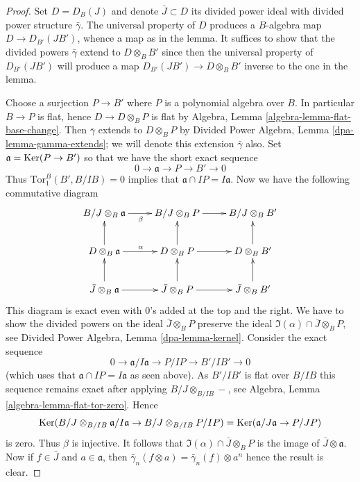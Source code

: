 \begin{proof}
Set $D = D_B(J)$ and denote $\bar J \subset D$ its divided power ideal
with divided power structure $\bar\gamma$. The universal property of
$D$ produces a $B$-algebra map $D \to D_{B'}(JB')$, whence a map as in
the lemma. It suffices to show that
the divided powers $\bar\gamma$ extend to $D \otimes_B B'$ since then
the universal property of $D_{B'}(JB')$ will produce a map
$D_{B'}(JB') \to D \otimes_B B'$ inverse to the one in the lemma.

\medskip\noindent
Choose a surjection $P \to B'$ where $P$ is a polynomial algebra over $B$.
In particular $B \to P$ is flat, hence $D \to D \otimes_B P$ is flat by
Algebra, Lemma \ref{algebra-lemma-flat-base-change}.
Then $\bar\gamma$ extends to $D \otimes_B P$ by
Divided Power Algebra, Lemma \ref{dpa-lemma-gamma-extends}; we
will denote this extension
$\bar\gamma$ also. Set $\mathfrak a = \mathop{\mathrm{Ker}}(P \to B')$ so that
we have the short exact sequence
$$
0 \to \mathfrak a \to P \to B' \to 0
$$
Thus $\text{Tor}_1^B(B', B/IB) = 0$ implies that
$\mathfrak a \cap IP = I\mathfrak a$.
Now we have the following commutative diagram
$$
\xymatrix{
B/J \otimes_B \mathfrak a \ar[r]_\beta &
B/J \otimes_B P \ar[r] &
B/J \otimes_B B' \\
D \otimes_B \mathfrak a \ar[r]^\alpha \ar[u] &
D \otimes_B P \ar[r] \ar[u] &
D \otimes_B B' \ar[u] \\
\bar J \otimes_B \mathfrak a \ar[r] \ar[u] &
\bar J \otimes_B P \ar[r] \ar[u] &
\bar J \otimes_B B' \ar[u]
}
$$
This diagram is exact even with $0$'s added at the top and the right.
We have to show the divided powers on the ideal
$\bar J \otimes_B P$ preserve the ideal
$\Im(\alpha) \cap \bar J \otimes_B P$, see
Divided Power Algebra, Lemma \ref{dpa-lemma-kernel}.
Consider the exact sequence
$$
0 \to \mathfrak a/I\mathfrak a \to P/IP \to B'/IB' \to 0
$$
(which uses that $\mathfrak a \cap IP = I\mathfrak a$ as seen above).
As $B'/IB'$ is flat over $B/IB$ this sequence remains exact after
applying $B/J \otimes_{B/IB} -$, see
Algebra, Lemma \ref{algebra-lemma-flat-tor-zero}. Hence
$$
\mathop{\mathrm{Ker}}(B/J \otimes_{B/IB} \mathfrak a/I\mathfrak a \to
B/J \otimes_{B/IB} P/IP) =
\mathop{\mathrm{Ker}}(\mathfrak a/J\mathfrak a \to P/JP)
$$
is zero. Thus $\beta$ is injective. It follows that
$\Im(\alpha) \cap \bar J \otimes_B P$ is the
image of $\bar J \otimes \mathfrak a$. Now if
$f \in \bar J$ and $a \in \mathfrak a$, then
$\bar\gamma_n(f \otimes a) = \bar\gamma_n(f) \otimes a^n$
hence the result is clear.
\end{proof}

